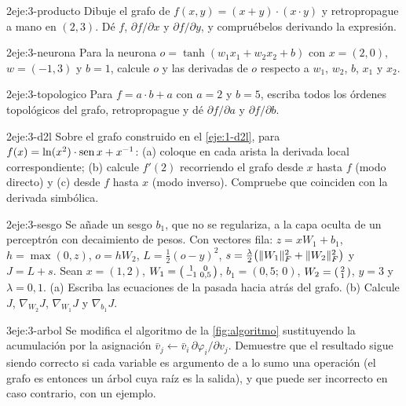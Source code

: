 \begin{ejercicio}{2}{eje:3-producto}
Dibuje el grafo de $f(x,y)=(x+y)\cdot(x\cdot y)$ y retropropague a mano en $(2,3)$. Dé $f$, $\partial f/\partial x$ y $\partial f/\partial y$, y compruébelos derivando la expresión.
\end{ejercicio}

\begin{ejercicio}{2}{eje:3-neurona}
Para la neurona $o=\tanh(w_1x_1+w_2x_2+b)$ con $x=(2,0)$, $w=(-1,3)$ y $b=1$, calcule $o$ y las derivadas de $o$ respecto a $w_1$, $w_2$, $b$, $x_1$ y $x_2$.
\end{ejercicio}

\begin{ejercicio}{2}{eje:3-topologico}
Para $f=a\cdot b+a$ con $a=2$ y $b=5$, escriba todos los órdenes topológicos del grafo, retropropague y dé $\partial f/\partial a$ y $\partial f/\partial b$.
\end{ejercicio}

\begin{ejercicio}{2}{eje:3-d2l}
Sobre el grafo construido en el \cref{eje:1-d2l}, para $f(x)=\ln(x^{2})\cdot\operatorname{sen} x+x^{-1}$: (a) coloque en cada arista la derivada local correspondiente; (b) calcule $f'(2)$ recorriendo el grafo desde $x$ hasta $f$ (modo directo) y (c) desde $f$ hasta $x$ (modo inverso). Compruebe que coinciden con la derivada simbólica.
\end{ejercicio}

\begin{ejercicio}{2}{eje:3-sesgo}
Se añade un sesgo $b_1$, que no se regulariza, a la capa oculta de un perceptrón con decaimiento de pesos. Con vectores fila: $z=xW_1+b_1$, $h=\max(0,z)$, $o=hW_2$, $L=\tfrac12(o-y)^{2}$, $s=\tfrac{\lambda}{2}\bigl(\lVert W_1\rVert_F^{2}+\lVert W_2\rVert_F^{2}\bigr)$ y $J=L+s$. Sean $x=(1,2)$, $W_1=\begin{psmallmatrix}1&0\\-1&0{,}5\end{psmallmatrix}$, $b_1=(0{,}5;\,0)$, $W_2=\begin{psmallmatrix}2\\1\end{psmallmatrix}$, $y=3$ y $\lambda=0{,}1$. (a) Escriba las ecuaciones de la pasada hacia atrás del grafo. (b) Calcule $J$, $\nabla_{\!W_2}J$, $\nabla_{\!W_1}J$ y $\nabla_{\!b_1}J$.
\end{ejercicio}

\begin{ejercicio}{3}{eje:3-arbol}
Se modifica el algoritmo de la \cref{fig:algoritmo} sustituyendo la acumulación por la asignación $\bar v_j\gets\bar v_i\,\partial\varphi_i/\partial v_j$. Demuestre que el resultado sigue siendo correcto si cada variable es argumento de a lo sumo una operación (el grafo es entonces un árbol cuya raíz es la salida), y que puede ser incorrecto en caso contrario, con un ejemplo.
\end{ejercicio}
